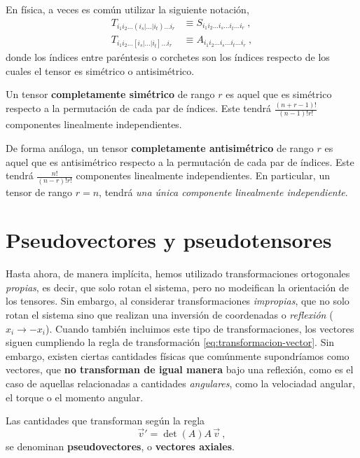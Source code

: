 \begin{itemize}
    En física, a veces es común utilizar la siguiente notación,
    \begin{align}
        T_{i_1 i_2 \dots (i_s| \dots |i_t) \dots i_r} & \equiv S_{i_1 i_2 \dots i_s \dots i_t \dots i_r} \ , \\
        T_{i_1 i_2 \dots [i_s| \dots |i_t] \dots i_r} & \equiv A_{i_1 i_2 \dots i_s \dots i_t \dots i_r} \ ,
    \end{align}
    donde los índices entre paréntesis o corchetes son los índices respecto de los cuales el tensor es simétrico o antisimétrico.

    Un tensor \textbf{completamente simétrico} de rango $r$ es aquel que es simétrico respecto a la permutación de cada par de índices. Este tendrá $\frac{(n+r-1)!}{(n-1)! r!}$ componentes linealmente independientes.

    De forma análoga, un tensor \textbf{completamente antisimétrico} de rango $r$ es aquel que es antisimétrico respecto a la permutación de cada par de índices. Este tendrá $\frac{n!}{(n-r)! r!}$ componentes linealmente independientes. En particular, un tensor de rango $r=n$, tendrá \emph{una única componente linealmente independiente}.
\end{itemize}

\section{Pseudovectores y pseudotensores}

Hasta ahora, de manera implícita, hemos utilizado transformaciones ortogonales \emph{propias}, es decir, que solo rotan el sistema, pero no modeifican la orientación de los tensores. Sin embargo, al considerar transformaciones \emph{impropias}, que no solo rotan el sistema sino que realizan una inversión de coordenadas o \emph{reflexión} ($x_i \to -x_i$). Cuando también incluimos este tipo de transformaciones, los vectores siguen cumpliendo la regla de transformación \eqref{eq:transformacion-vector}. Sin embargo, existen ciertas cantidades físicas que comúnmente supondríamos como vectores, que \textbf{no transforman de igual manera} bajo una reflexión, como es el caso de aquellas relacionadas a cantidades \emph{angulares}, como la velociadad angular, el torque o el momento angular.

\begin{defi} 
    Las cantidades que transforman según la regla
    \begin{equation} \label{eq:pseudovector}
        \vec{v}' = \det(A) A \, \vec{v} \ ,
    \end{equation}
    se denominan \textbf{pseudovectores}, o \textbf{vectores axiales}.
\end{defi}

